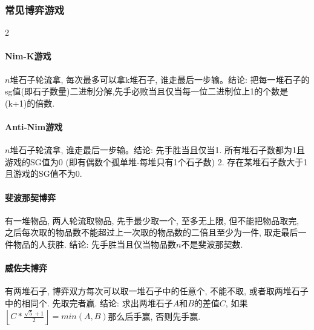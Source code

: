 \begin{footnotesize}
\subsubsection{常见博弈游戏}
\begin{multicols}{2}
\paragraph{Nim-K游戏}$n$堆石子轮流拿, 每次最多可以拿k堆石子, 谁走最后一步输。结论: 把每一堆石子的sg值(即石子数量)二进制分解,先手必败当且仅当每一位二进制位上1的个数是(k+1)的倍数. 
\paragraph{Anti-Nim游戏}$n$堆石子轮流拿, 谁走最后一步输。结论: 先手胜当且仅当1. 所有堆石子数都为1且游戏的SG值为0 (即有偶数个孤单堆-每堆只有1个石子数) 2. 存在某堆石子数大于1且游戏的SG值不为0.
\paragraph{斐波那契博弈}有一堆物品, 两人轮流取物品, 先手最少取一个, 至多无上限, 但不能把物品取完, 之后每次取的物品数不能超过上一次取的物品数的二倍且至少为一件, 取走最后一件物品的人获胜. 结论: 先手胜当且仅当物品数$n$不是斐波那契数. 
\paragraph{威佐夫博弈}有两堆石子, 博弈双方每次可以取一堆石子中的任意个, 不能不取, 或者取两堆石子中的相同个. 先取完者赢. 结论: 求出两堆石子$A$和$B$的差值$C$, 如果$\left\lfloor C*\frac{\sqrt{5}+1}{2}\right\rfloor=min(A,B)$那么后手赢, 否则先手赢. 

\end{multicols}
\end{footnotesize}
